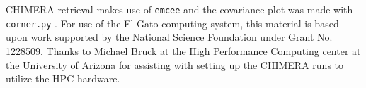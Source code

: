\documentclass{emulateapj}
\begin{document}
CHIMERA retrieval makes use of \texttt{emcee} \citep{foreman-mackey2013emcee} and the covariance plot was made with \texttt{corner.py} \citep{foremanCorner}. For use of the El Gato computing system, this material is based upon work supported by the National Science Foundation under Grant No. 1228509. Thanks to Michael Bruck at the High Performance Computing center at the University of Arizona for assisting with setting up the CHIMERA runs to utilize the HPC hardware.








\end{document}
